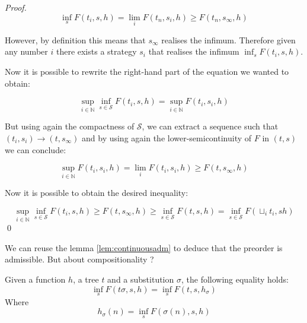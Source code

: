 \begin{proof}
    \begin{equation*}
        \inf_s F(t_i, s, h) = \lim_i F(t_n, s_i, h) 
                            \geq F (t_n, s_\infty, h)
    \end{equation*}

    However, by definition this means that 
    $s_\infty$ realises the infimum. Therefore given any 
    number $i$ there exists a strategy $s_i$ that realises 
    the infimum $\inf_s F(t_i, s, h)$.

    Now it is possible to rewrite the right-hand part 
    of the equation we wanted to obtain:

    \begin{equation*}
        \sup_{i \in \mathbb{N}} \inf_{s \in \mathcal{S}} F(t_i,s,h) 
        = 
        \sup_{i \in \mathbb{N}}  F(t_i,s_i,h)
    \end{equation*}

    But using again the compactness of $\mathcal{S}$, we can 
    extract a sequence such that $(t_i,s_i) \longrightarrow (t,s_\infty)$
    and by using again the lower-semicontinuity of $F$ in $(t,s)$ we can 
    conclude:

    \begin{equation*}
        \sup_{i \in \mathbb{N}}  F(t_i,s_i,h) = \lim_i F(t_i, s_i, h) \geq
        F(t,s_\infty, h)
    \end{equation*}

    Now it is possible to obtain the desired inequality:

    \begin{equation*}
        \sup_{i \in \mathbb{N}} \inf_{s \in \mathcal{S}} F(t_i,s,h) 
        \geq 
        F(t,s_\infty, h)
        \geq 
        \inf_{s \in \mathcal{S}} F(t,s,h)
        = 
        \inf_{s \in \mathcal{S}} F (\sqcup_i t_i, s h)
    \end{equation*}
    \qed
\end{proof}

We can reuse the lemma \ref{lem:continuousadm} to deduce 
that the preorder is admissible. But about compositionality ?

\begin{lemma}[Decomposition]
    \label{lem:mixeddecomposition}
    Given a function $h$, a tree $t$ and a substitution $\sigma$,
    the following equality holds:
    \begin{equation*}
        \inf_s F(t\sigma ,s,h) = \inf_s F(t,s,h_\sigma)
    \end{equation*}
    Where
    \begin{equation*}
        h_\sigma (n) = \inf_s F(\sigma(n),s,h)
    \end{equation*}
\end{lemma}

